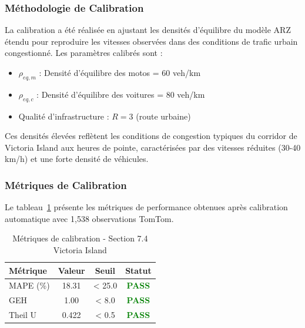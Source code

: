 \subsubsection{Méthodologie de Calibration}

La calibration a été réalisée en ajustant les densités d'équilibre du modèle ARZ étendu
pour reproduire les vitesses observées dans des conditions de trafic urbain congestionné.
Les paramètres calibrés sont :

\begin{itemize}
    \item $\rho_{eq,m}$ : Densité d'équilibre des motos = 60 veh/km
    \item $\rho_{eq,c}$ : Densité d'équilibre des voitures = 80 veh/km
    \item Qualité d'infrastructure : $R = 3$ (route urbaine)
\end{itemize}

Ces densités élevées reflètent les conditions de congestion typiques du corridor de Victoria Island
aux heures de pointe, caractérisées par des vitesses réduites (30-40 km/h) et une forte densité
de véhicules.

\subsubsection{Métriques de Calibration}

Le tableau~\ref{tab:calibration_metrics_74} présente les métriques de performance
obtenues après calibration automatique avec 1,538 observations TomTom.

\begin{table}[h]
    \centering
    \caption{Métriques de calibration - Section 7.4 Victoria Island}
    \label{tab:calibration_metrics_74}
    \begin{tabular}{|l|c|c|c|}
        \hline
        \textbf{Métrique} & \textbf{Valeur} & \textbf{Seuil} & \textbf{Statut}                  \\
        \hline
        MAPE (\%)         & 18.31           & < 25.0         & \textcolor{green}{\textbf{PASS}} \\
        GEH               & 1.00            & < 8.0          & \textcolor{green}{\textbf{PASS}} \\
        Theil U           & 0.422           & < 0.5          & \textcolor{green}{\textbf{PASS}} \\
        \hline
    \end{tabular}
\end{table}

